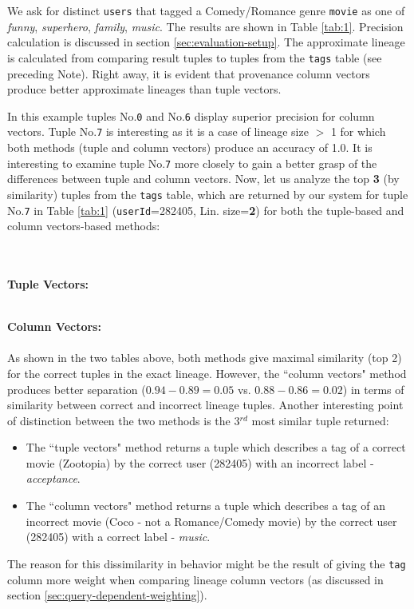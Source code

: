 % 
\begin{example-withrun}\label{experiment:1}



We ask for distinct \texttt{users} that tagged a Comedy/Romance genre \texttt{movie} as one of \textit{funny}, \textit{superhero}, \textit{family}, \textit{music}. The results are shown in Table \ref{tab:1}. Precision calculation is discussed in section \ref{sec:evaluation-setup}. The approximate lineage is calculated from comparing result tuples to tuples from the \texttt{tags} table (see preceding Note). Right away, it is evident that provenance column vectors produce better approximate lineages than tuple vectors.\\
\par In this example tuples No.\texttt{0} and No.\texttt{6} display superior precision for column vectors. Tuple No.\texttt{7} is  interesting as it is a case of lineage size $>$ 1 for which both methods (tuple and column vectors) produce an accuracy of 1.0.
It is interesting to examine tuple No.\texttt{7} more closely to gain a better grasp of the differences between tuple and column vectors.
Now, let us analyze the top \textbf{3} (by similarity) tuples from the \texttt{tags} table, which are returned by our system for tuple No.\texttt{7} in Table \ref{tab:1} (\texttt{userId}=282405, Lin. size=\textbf{2}) for both the tuple-based and column vectors-based methods:\\\\\\
\par\textbf{Tuple Vectors:}\\
\\
\par\textbf{Column Vectors:}\\

\\
As shown in the two tables above, both methods give maximal similarity (top 2) for the correct tuples in the exact lineage. However, the ``column vectors" method produces better separation ($0.94-0.89 = 0.05$ vs. $0.88-0.86=0.02$) in terms of similarity between correct and incorrect lineage tuples. Another interesting point of distinction between the two methods is the 3$^{rd}$ most similar tuple returned:
\begin{itemize}
    \item The ``tuple vectors" method returns a tuple which describes a tag of a correct movie (Zootopia) by the correct user (282405) with an incorrect label - \textit{acceptance}.
    \item The ``column vectors" method returns a tuple which describes a tag of an incorrect movie (Coco - not a Romance/Comedy movie) by the correct user (282405) with a correct label - \textit{music}.
\end{itemize}
The reason for this dissimilarity in behavior might be the result of giving the \texttt{tag} column more weight when comparing lineage column vectors (as discussed in section \ref{sec:query-dependent-weighting}).


\end{example-withrun}
